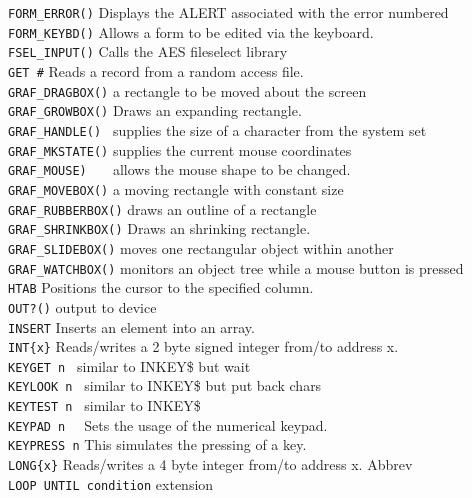 \begin{tabbing}
\verb|FORM_ERROR()|\>    Displays the ALERT associated with the error numbered\\
\verb|FORM_KEYBD()|\>    Allows a form to be edited via the keyboard.\\
\verb|FSEL_INPUT()|\>    Calls the AES fileselect library\\
\verb|GET #|\>	      Reads a record from a random access file.\\
\verb|GRAF_DRAGBOX()|\>  a rectangle to be moved about the screen\\
\verb|GRAF_GROWBOX()|\>  Draws an expanding rectangle.\\
\verb|GRAF_HANDLE() |\>  supplies the size of a character from the system set\\
\verb|GRAF_MKSTATE()|\>  supplies the current mouse  coordinates\\
\verb|GRAF_MOUSE)   |\>  allows  the  mouse  shape  to  be  changed.\\
\verb|GRAF_MOVEBOX()|\>  a moving rectangle with constant size\\
\verb|GRAF_RUBBERBOX()|\> draws an outline of a rectangle\\
\verb|GRAF_SHRINKBOX()|\> Draws an shrinking rectangle.\\
\verb|GRAF_SLIDEBOX()|\>  moves one rectangular object within another\\
\verb|GRAF_WATCHBOX()|\>  monitors  an object tree while a mouse button  is  pressed\\
\verb|HTAB|\>	       Positions  the cursor to the  specified  column. \\  
\verb|OUT?()|\>  output to device\\
\verb|INSERT|\>	       Inserts  an  element  into  an  array.\\
\verb|INT{x}|\>	       Reads/writes a 2 byte signed integer from/to address x.\\
\verb|KEYGET n |\>        similar to INKEY\$  but wait\\
\verb|KEYLOOK n |\>       similar to INKEY\$  but put back chars\\
\verb|KEYTEST n |\>       similar to INKEY\$\\
\verb|KEYPAD n  |\>       Sets  the  usage of the  numerical  keypad.\\
\verb|KEYPRESS n|\>       This  simulates the pressing of a key.\\
\verb|LONG{x}|\>	       Reads/writes a 4 byte integer from/to address x. Abbrev {}\\
\verb|LOOP UNTIL condition|\>     extension\\

\end{tabbing}
